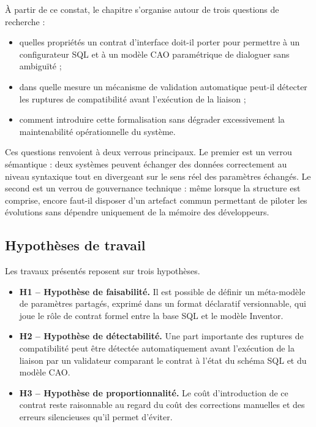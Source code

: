 À partir de ce constat, le chapitre s'organise autour de trois questions de recherche :

\begin{itemize}[leftmargin=1.4cm]
\item quelles propriétés un contrat d'interface doit-il porter pour permettre à un configurateur SQL et à un modèle CAO paramétrique de dialoguer sans ambiguïté ;
\item dans quelle mesure un mécanisme de validation automatique peut-il détecter les ruptures de compatibilité avant l'exécution de la liaison ;
\item comment introduire cette formalisation sans dégrader excessivement la maintenabilité opérationnelle du système.
\end{itemize}

Ces questions renvoient à deux verrous principaux. Le premier est un verrou sémantique : deux systèmes peuvent échanger des données correctement au niveau syntaxique tout en divergeant sur le sens réel des paramètres échangés. Le second est un verrou de gouvernance technique : même lorsque la structure est comprise, encore faut-il disposer d'un artefact commun permettant de piloter les évolutions sans dépendre uniquement de la mémoire des développeurs.

\subsection{Hypothèses de travail}

Les travaux présentés reposent sur trois hypothèses.

\begin{itemize}[leftmargin=1.4cm]
\item \textbf{H1 -- Hypothèse de faisabilité.} Il est possible de définir un méta-modèle de paramètres partagés, exprimé dans un format déclaratif versionnable, qui joue le rôle de contrat formel entre la base SQL et le modèle Inventor.
\item \textbf{H2 -- Hypothèse de détectabilité.} Une part importante des ruptures de compatibilité peut être détectée automatiquement avant l'exécution de la liaison par un validateur comparant le contrat à l'état du schéma SQL et du modèle CAO.
\item \textbf{H3 -- Hypothèse de proportionnalité.} Le coût d'introduction de ce contrat reste raisonnable au regard du coût des corrections manuelles et des erreurs silencieuses qu'il permet d'éviter.
\end{itemize}

